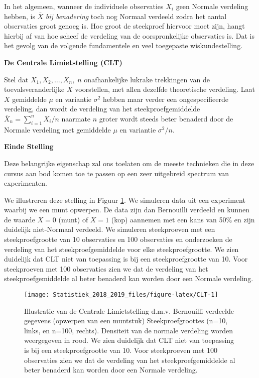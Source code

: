 \documentclass[12pt,dutch,coursenotes]{book}
\theoremstyle{definition}
\theoremstyle{definition}
\theoremstyle{definition}
\theoremstyle{remark}
\begin{document}
In het algemeen, wanneer de individuele observaties \(X_i\) geen Normale
verdeling hebben, is \(\bar X\) \textit{bij benadering} toch nog Normaal
verdeeld zodra het aantal observaties groot genoeg is. Hoe groot de
steekproef hiervoor moet zijn, hangt hierbij af van hoe scheef de
verdeling van de oorspronkelijke observaties is. Dat is het gevolg van
de volgende fundamentele en veel toegepaste wiskundestelling.

\textbf{De Centrale Limietstelling (CLT)}

Stel dat \(X_1, X_2, \dots, X_n, \; n\) onafhankelijke lukrake
trekkingen van de toevalsveranderlijke \(X\) voorstellen, met allen
dezelfde theoretische verdeling. Laat \(X\) gemiddelde \(\mu\) en
variantie \(\sigma^2\) hebben maar verder een ongespecifieerde
verdeling, dan wordt de verdeling van het steekproefgemiddelde
\(\bar{X}_n = {\sum_{i=1}^{n} X_i}/{n}\) naarmate \(n\) groter wordt
steeds beter benaderd door de Normale verdeling met gemiddelde \(\mu\)
en variantie \(\sigma^2/n.\)

\textbf{Einde Stelling}

Deze belangrijke eigenschap zal ons toelaten om de meeste technieken die
in deze cursus aan bod komen toe te passen op een zeer uitgebreid
spectrum van experimenten.

We illustreren deze stelling in Figuur \ref{fig:CLT}. We simuleren data
uit een experiment waarbij we een munt opwerpen. De data zijn dan
Bernouilli verdeeld en kunnen de waarde \(X=0\) (munt) of \(X=1\) (kop)
aannemen met een kans van 50\% en zijn duidelijk niet-Normaal verdeeld.
We simuleren steekproeven met een steekproefgrootte van 10 observaties
en 100 observaties en onderzoeken de verdeling van het
steekproefgemiddelde voor elke steekproefgrootte. We zien duidelijk dat
CLT niet van toepassing is bij een steekproefgrootte van 10. Voor
steekproeven met 100 observaties zien we dat de verdeling van het
steekproefgemiddelde al beter benaderd kan worden door een Normale
verdeling.

\begin{figure}

{\centering \texttt{[image: Statistiek\_2018\_2019\_files/figure-latex/CLT-1]} 

}

\caption{Illustratie van de Centrale Limietstelling d.m.v. Bernouilli verdeelde gegevens (opwerpen van een muntstuk) Steekproefgroottes (n=10, links, en n=100, rechts). Densiteit van de normale verdeling worden weergegeven in rood. We zien duidelijk dat CLT niet van toepassing is bij een steekproefgrootte van 10. Voor steekproeven met 100 observaties zien we dat de verdeling van het steekproefgemiddelde al beter benaderd kan worden door een Normale verdeling.}\label{fig:CLT}
\end{figure}
\end{document}
